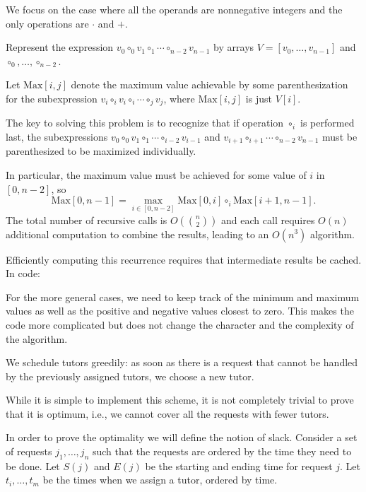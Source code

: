 We focus on the case where all the operands are nonnegative integers
and the only operations are $\cdot$ and $+$. 

Represent the expression $v_0 \circ_0 v_1 \circ_1 \cdots \circ_{n-2} v_{n-1}$ 
by arrays $V = [v_0,\ldots,v_{n-1}]$ and $\circ_0,\ldots,\circ_{n-2}$.

Let $\mbox{Max}[i,j]$ denote
the maximum value achievable by some parenthesization for
the subexpression $v_i \circ_i v_i \circ_i \cdots \circ_{j} v_{j}$,
where $\mbox{Max}[i,j]$ is just $V[i]$.

The key to solving this problem is to recognize that if operation 
$\circ_i$ is performed last, the subexpressions
$v_0 \circ_0 v_1 \circ_1 \cdots \circ_{i-2} v_{i-1}$ and
$v_{i+1} \circ_{i+1}  \cdots \circ_{n-2} v_{n-1}$ must be parenthesized
to be maximized individually.  

In particular, the maximum value must be achieved
for some value of $i$ in $[0,n-2]$, so 
\[
\mbox{Max}[0,n-1] = \max_{i \in [0,n-2]} \mbox{Max}[0,i] \circ_i \mbox{Max}[i+1,n-1] .
\]
The total number of recursive calls is $O(\binom{n}{2})$ and each
call requires $O(n)$ additional computation to combine the results,
leading to an $O(n^3)$ algorithm.

Efficiently computing this recurrence requires that intermediate
results be cached. In code:


For the more general cases, we need to keep track of the minimum and maximum values
as well as the positive and negative values closest to zero.
This makes the code more complicated but does not change the 
character and the complexity of the algorithm.

We schedule tutors greedily: as soon as there is a request that cannot be handled by the previously assigned tutors, we choose a new tutor. 

While it is simple to implement this scheme, it is not completely
trivial to prove that it is
optimum, i.e., we cannot cover all the requests with fewer
tutors.

In order to prove the optimality we will define the notion of slack.
Consider a set of requests $j_1,\ldots,j_n$ such that the requests are ordered by the time
they need to be done. Let $S(j)$ and $E(j)$ be the starting and ending
time for request $j$.  Let $t_i,\ldots,t_m$ be the times when we assign a
tutor, ordered by time. 

